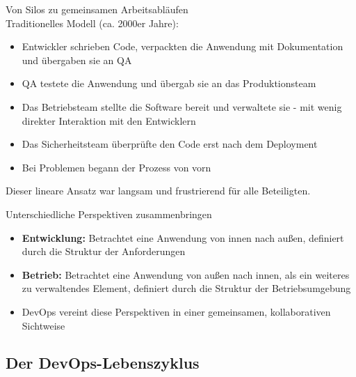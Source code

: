 \begin{concept}{Von Silos zu gemeinsamen Arbeitsabläufen}\\
    Traditionelles Modell (ca. 2000er Jahre):
    \begin{itemize}
        \item Entwickler schrieben Code, verpackten die Anwendung mit Dokumentation und übergaben sie an QA
        \item QA testete die Anwendung und übergab sie an das Produktionsteam
        \item Das Betriebsteam stellte die Software bereit und verwaltete sie - mit wenig direkter Interaktion mit den Entwicklern
        \item Das Sicherheitsteam überprüfte den Code erst nach dem Deployment
        \item Bei Problemen begann der Prozess von vorn
    \end{itemize}
    Dieser lineare Ansatz war langsam und frustrierend für alle Beteiligten.
\end{concept}

\begin{concept}{Unterschiedliche Perspektiven zusammenbringen}\\
    \begin{itemize}
        \item \textbf{Entwicklung:} Betrachtet eine Anwendung von innen nach außen, definiert durch die Struktur der Anforderungen
        \item \textbf{Betrieb:} Betrachtet eine Anwendung von außen nach innen, als ein weiteres zu verwaltendes Element, definiert durch die Struktur der Betriebsumgebung
        \item DevOps vereint diese Perspektiven in einer gemeinsamen, kollaborativen Sichtweise
    \end{itemize}
\end{concept}

\subsection{Der DevOps-Lebenszyklus}

